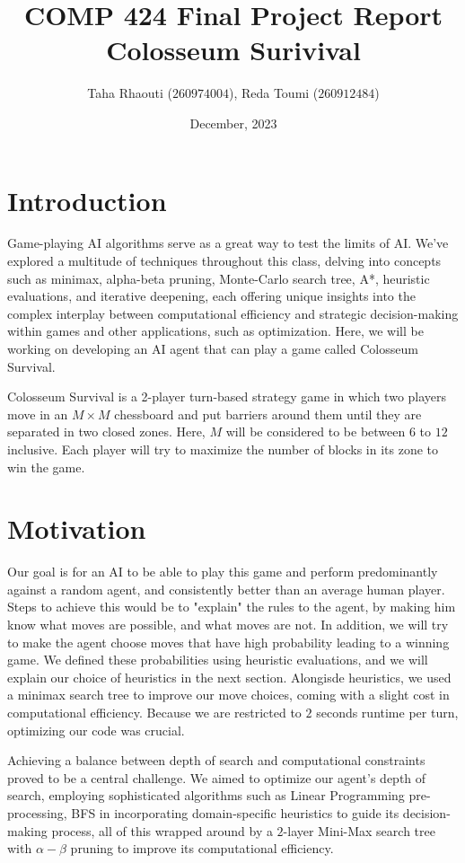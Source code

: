 \documentclass[11pt]{article}
\title{COMP 424 Final Project Report \\ Colosseum Surivival}
\author{Taha Rhaouti ($260974004$), Reda Toumi ($260912484$)}
\date{December, 2023}
\begin{document}
\maketitle

\section{Introduction}

Game-playing AI algorithms serve as a great way to test the limits of AI. We've explored 
a multitude of techniques throughout this class, delving into concepts such as minimax, alpha-beta pruning, 
Monte-Carlo search tree, A*, heuristic evaluations, and iterative deepening, each offering unique insights into the complex interplay 
between computational efficiency and strategic decision-making within games and other applications, such as optimization. Here, we will be working on developing
an AI agent that can play a game called Colosseum Survival.

Colosseum Survival is a 2-player turn-based strategy game in which two players move in an $M\times M$ chessboard and put barriers
around them until they are separated in two closed zones. Here, $M$ will be considered to be between $6$ to $12$ inclusive.
Each player will try to maximize the number of blocks in its zone to win the game.


\section{Motivation}

Our goal is for an AI to be able to play this game and perform predominantly against a random agent, and consistently better than an average human player. Steps to achieve this would be to "explain" the rules
to the agent, by making him know what moves are possible, and what moves are not. In addition, we will try to make the agent choose moves that have high probability
leading to a winning game. We defined these probabilities using heuristic evaluations, and we will explain our choice of heuristics in the next section. Alongisde heuristics, we used a minimax search
tree to improve our move choices, coming with a slight cost in computational efficiency. Because we are restricted to $2$ seconds runtime per turn, optimizing our code was crucial.

Achieving a balance between depth of search and computational constraints proved to be a central challenge. We aimed to optimize our agent's depth of search, employing sophisticated algorithms such as Linear
Programming pre-processing, BFS in incorporating domain-specific heuristics to guide its decision-making process, all of this wrapped around by a $2$-layer Mini-Max search tree with $\alpha - \beta$ pruning to improve its computational efficiency.
\end{document}

